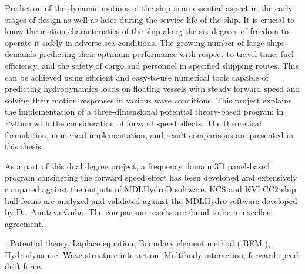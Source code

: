 \abstract
Prediction of the dynamic motions of the ship is an essential aspect in the early stages of design as well as later during the service life of the ship. It is crucial to know the motion characteristics of the ship along the six degrees of freedom to operate it safely in adverse sea conditions. The growing number of large ships demands predicting their optimum performance with respect to travel time, fuel efficiency, and the safety of cargo and personnel in specified shipping routes. This can be achieved using efficient and easy-to-use numerical tools capable of predicting hydrodynamics loads on floating vessels with steady forward speed and solving their motion responses in various wave conditions. This project explains the implementation of a three-dimensional potential theory-based program in Python with the consideration of forward speed effects. The theoretical formulation, numerical implementation, and result comparisons are presented in this thesis.

As a part of this dual degree project, a frequency domain 3D panel-based 
program considering the forward speed effect
has been developed and extensively compared against the outputs of 
MDLHydroD software. KCS and KVLCC2 ship hull forms are analyzed and validated 
against the MDLHydro software developed by Dr. Amitava Guha. The comparison 
results are found to be in excellent agreement.


    
 : Potential theory, Laplace equation, Boundary element method ( BEM ), Hydrodynamic, Wave structure interaction, Multibody interaction, forward speed, drift force.
